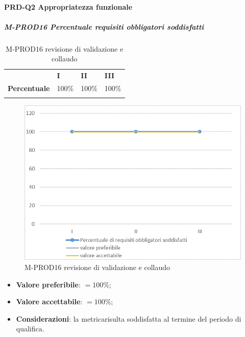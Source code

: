 \paragraph*{PRD-Q2 Appropriatezza funzionale}
\subparagraph{M-PROD16 Percentuale requisiti obbligatori soddisfatti} \mbox{}
\begin{longtable}[H!] {						
		>{}p{50mm}  		
		>{}p{8mm}
		>{}p{8mm}		
		>{}p{8mm}		
	}
	\rowcolor{gray!50}
	\textbf{} & \textbf{I} & \textbf{II} & \textbf{III} \TBstrut \\ [2mm]
	\textbf{Percentuale} & 100\% & 100\% & 100\%  \TBstrut \\ [2mm]
	\rowcolor{white}
	\caption{M-PROD16 revisione di validazione e collaudo}
\end{longtable}
\begin{figure}[H] 	
	\includegraphics[width=\linewidth]{./img/grafici/RA16.png}	
	\caption{M-PROD16 revisione di validazione e collaudo}	
\end{figure}
\begin{itemize}
	\item \textbf{Valore preferibile}: $=100\%$;
	\item \textbf{Valore accettabile}: $=100\%$;
	\item \textbf{Considerazioni}: la metrica\glosp risulta soddisfatta al termine del periodo di qualifica.
\end{itemize}

